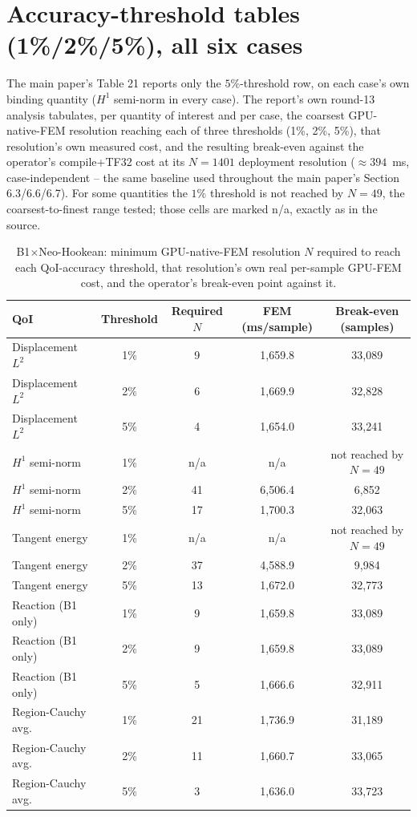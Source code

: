 \documentclass[11pt]{article}
\begin{document}
\FloatBarrier
\section{Accuracy-threshold tables (1\%/2\%/5\%), all six cases}
\label{sec:s3}
The main paper's Table 21 reports only the $5\%$-threshold row, on each
case's own binding quantity ($H^1$ semi-norm in every case). The report's
own round-13 analysis tabulates, per quantity of interest and per case,
the coarsest GPU-native-FEM resolution reaching each of three thresholds
(1\%, 2\%, 5\%), that resolution's own measured cost, and the resulting
break-even against the operator's compile+TF32 cost at its $N{=}1401$
deployment resolution ($\approx394$~ms, case-independent -- the same
baseline used throughout the main paper's Section 6.3/6.6/6.7).
For some quantities the $1\%$ threshold is not reached by $N{=}49$, the
coarsest-to-finest range tested; those cells are marked n/a, exactly as
in the source.

\begin{table}[h]
\centering
\caption{B1$\times$Neo-Hookean: minimum GPU-native-FEM resolution $N$
  required to reach each QoI-accuracy threshold, that resolution's own
  real per-sample GPU-FEM cost, and the operator's break-even point
  against it.}
\label{tab:s3-b1nh}
\small
\begin{tabular}{lcccc}
\toprule
QoI & Threshold & Required $N$ & FEM (ms/sample) & Break-even (samples) \\
\midrule
Displacement $L^2$  & 1\% & 9   & 1{,}659.8 & 33{,}089 \\
Displacement $L^2$  & 2\% & 6   & 1{,}669.9 & 32{,}828 \\
Displacement $L^2$  & 5\% & 4   & 1{,}654.0 & 33{,}241 \\
$H^1$ semi-norm     & 1\% & n/a & n/a       & not reached by $N{=}49$ \\
$H^1$ semi-norm     & 2\% & 41  & 6{,}506.4 & 6{,}852 \\
$H^1$ semi-norm     & 5\% & 17  & 1{,}700.3 & 32{,}063 \\
Tangent energy      & 1\% & n/a & n/a       & not reached by $N{=}49$ \\
Tangent energy      & 2\% & 37  & 4{,}588.9 & 9{,}984 \\
Tangent energy      & 5\% & 13  & 1{,}672.0 & 32{,}773 \\
Reaction (B1 only)  & 1\% & 9   & 1{,}659.8 & 33{,}089 \\
Reaction (B1 only)  & 2\% & 9   & 1{,}659.8 & 33{,}089 \\
Reaction (B1 only)  & 5\% & 5   & 1{,}666.6 & 32{,}911 \\
Region-Cauchy avg.\ & 1\% & 21  & 1{,}736.9 & 31{,}189 \\
Region-Cauchy avg.\ & 2\% & 11  & 1{,}660.7 & 33{,}065 \\
Region-Cauchy avg.\ & 5\% & 3   & 1{,}636.0 & 33{,}723 \\
\bottomrule
\end{tabular}
\end{table}
\end{document}
